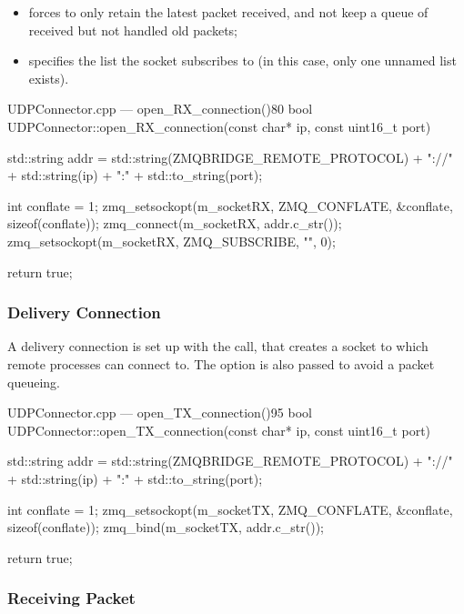 \begin{itemize}
	\item {} forces  to only retain the latest \gls{packet} received, and not keep a queue of received but not handled old \glspl{packet};
	\item {} specifies the list the socket subscribes to (in this case, only one unnamed list exists).
\end{itemize}

\begin{codelist}{UDPConnector.cpp --- open\_RX\_connection()}{80}
bool UDPConnector::open_RX_connection(const char* ip, const uint16_t port) {

    std::string addr = std::string(ZMQBRIDGE_REMOTE_PROTOCOL) + "://" + std::string(ip) + ":" + std::to_string(port);

    int conflate = 1;
    zmq_setsockopt(m_socketRX, ZMQ_CONFLATE, &conflate, sizeof(conflate));
    zmq_connect(m_socketRX, addr.c_str());
    zmq_setsockopt(m_socketRX, ZMQ_SUBSCRIBE, "", 0);

    return true;
}
\end{codelist}

\subsubsection{Delivery Connection}

A delivery connection is set up with the  call, that creates a socket to which remote  processes can connect to. The  option is also passed to avoid a \gls{packet} queueing.

\begin{codelist}{UDPConnector.cpp --- open\_TX\_connection()}{95}
bool UDPConnector::open_TX_connection(const char* ip, const uint16_t port) {
    std::string addr = std::string(ZMQBRIDGE_REMOTE_PROTOCOL) + "://" + std::string(ip) + ":" + std::to_string(port);

    int conflate = 1;
    zmq_setsockopt(m_socketTX, ZMQ_CONFLATE, &conflate, sizeof(conflate));
    zmq_bind(m_socketTX, addr.c_str());

    return true;
}
\end{codelist}

\subsubsection{Receiving Packet}


